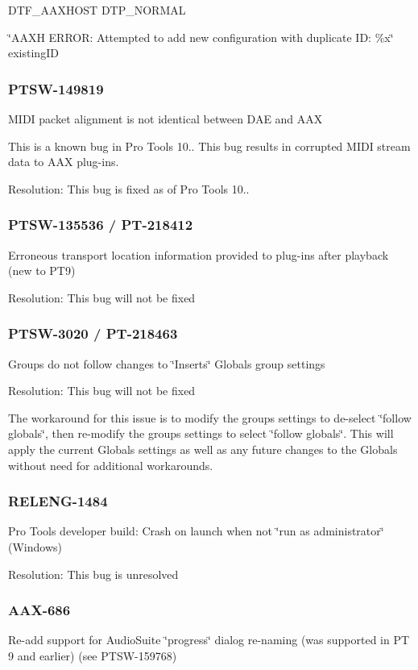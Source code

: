 D\+T\+F\+\_\+\+A\+A\+X\+H\+O\+S\+T D\+T\+P\+\_\+\+N\+O\+R\+M\+A\+L

\char`\"{}\+A\+A\+X\+H E\+R\+R\+O\+R\+: Attempted to add new configuration with duplicate I\+D\+: \%x\char`\"{} existing\+I\+D\hypertarget{a00374_PTSW-149819}{}\subsubsection{P\+T\+S\+W-\/149819}\label{a00374_PTSW-149819}
M\+I\+D\+I packet alignment is not identical between D\+A\+E and A\+A\+X

This is a known bug in Pro Tools 10.. This bug results in corrupted M\+I\+D\+I stream data to A\+A\+X plug-\/ins.

Resolution\+: This bug is fixed as of Pro Tools 10..\hypertarget{a00374_PTSW-135536}{}\subsubsection{P\+T\+S\+W-\/135536 / P\+T-\/218412}\label{a00374_PTSW-135536}
Erroneous transport location information provided to plug-\/ins after playback (new to P\+T9)

Resolution\+: This bug will not be fixed\hypertarget{a00374_PTSW-3020}{}\subsubsection{P\+T\+S\+W-\/3020 / P\+T-\/218463}\label{a00374_PTSW-3020}
Groups do not follow changes to \char`\"{}\+Inserts\char`\"{} Globals group settings

Resolution\+: This bug will not be fixed

The workaround for this issue is to modify the group\textquotesingle{}s settings to de-\/select \char`\"{}follow globals\char`\"{}, then re-\/modify the group\textquotesingle{}s settings to select \char`\"{}follow globals\char`\"{}. This will apply the current Globals settings as well as any future changes to the Globals without need for additional workarounds.\hypertarget{a00374_RELENG-1484}{}\subsubsection{R\+E\+L\+E\+N\+G-\/1484}\label{a00374_RELENG-1484}
Pro Tools developer build\+: Crash on launch when not \char`\"{}run as administrator\char`\"{} (Windows)

Resolution\+: This bug is unresolved\hypertarget{a00374_AAX-686}{}\subsubsection{A\+A\+X-\/686}\label{a00374_AAX-686}
Re-\/add support for Audio\+Suite \char`\"{}progress\char`\"{} dialog re-\/naming (was supported in P\+T 9 and earlier) (see P\+T\+S\+W-\/159768)

